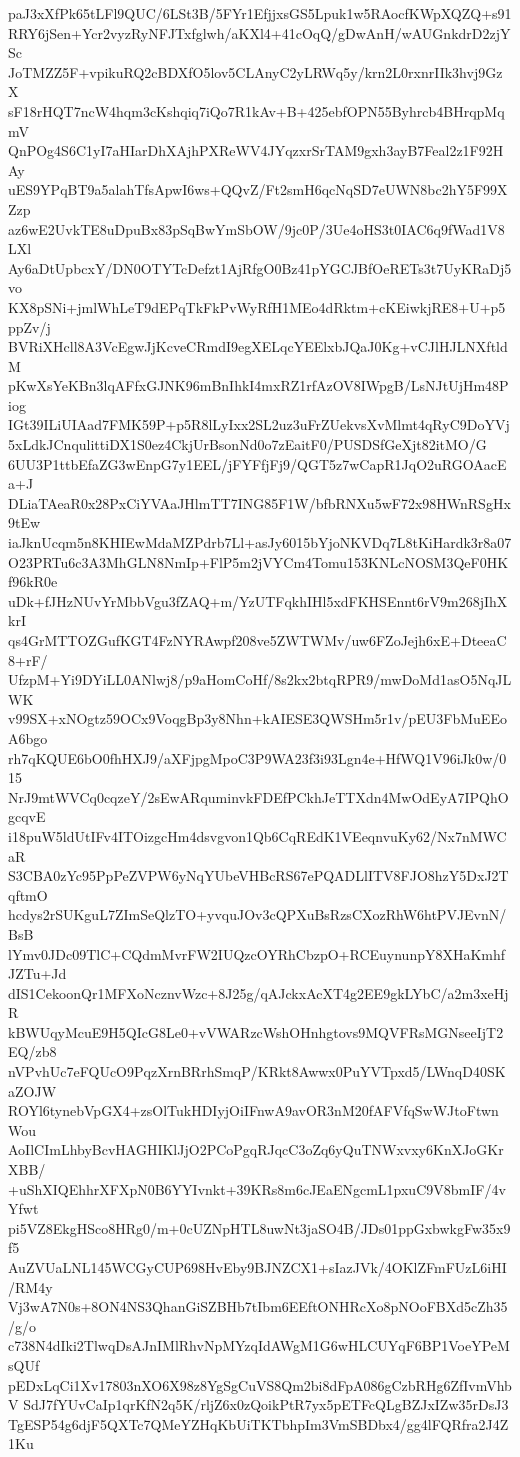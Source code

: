 paJ3xXfPk65tLFl9QUC/6LSt3B/5FYr1EfjjxsGS5Lpuk1w5RAocfKWpXQZQ+s91
RRY6jSen+Ycr2vyzRyNFJTxfglwh/aKXl4+41cOqQ/gDwAnH/wAUGnkdrD2zjYSc
JoTMZZ5F+vpikuRQ2cBDXfO5lov5CLAnyC2yLRWq5y/krn2L0rxnrIIk3hvj9GzX
sF18rHQT7ncW4hqm3cKshqiq7iQo7R1kAv+B+425ebfOPN55Byhrcb4BHrqpMqmV
QnPOg4S6C1yI7aHIarDhXAjhPXReWV4JYqzxrSrTAM9gxh3ayB7Feal2z1F92HAy
uES9YPqBT9a5alahTfsApwI6ws+QQvZ/Ft2smH6qcNqSD7eUWN8bc2hY5F99XZzp
az6wE2UvkTE8uDpuBx83pSqBwYmSbOW/9jc0P/3Ue4oHS3t0IAC6q9fWad1V8LXl
Ay6aDtUpbcxY/DN0OTYTcDefzt1AjRfgO0Bz41pYGCJBfOeRETs3t7UyKRaDj5vo
KX8pSNi+jmlWhLeT9dEPqTkFkPvWyRfH1MEo4dRktm+cKEiwkjRE8+U+p5ppZv/j
BVRiXHcll8A3VcEgwJjKcveCRmdI9egXELqcYEElxbJQaJ0Kg+vCJlHJLNXftldM
pKwXsYeKBn3lqAFfxGJNK96mBnIhkI4mxRZ1rfAzOV8IWpgB/LsNJtUjHm48Piog
IGt39ILiUIAad7FMK59P+p5R8lLyIxx2SL2uz3uFrZUekvsXvMlmt4qRyC9DoYVj
5xLdkJCnqulittiDX1S0ez4CkjUrBsonNd0o7zEaitF0/PUSDSfGeXjt82itMO/G
6UU3P1ttbEfaZG3wEnpG7y1EEL/jFYFfjFj9/QGT5z7wCapR1JqO2uRGOAacEa+J
DLiaTAeaR0x28PxCiYVAaJHlmTT7ING85F1W/bfbRNXu5wF72x98HWnRSgHx9tEw
iaJknUcqm5n8KHIEwMdaMZPdrb7Ll+asJy6015bYjoNKVDq7L8tKiHardk3r8a07
O23PRTu6c3A3MhGLN8NmIp+FlP5m2jVYCm4Tomu153KNLcNOSM3QeF0HKf96kR0e
uDk+fJHzNUvYrMbbVgu3fZAQ+m/YzUTFqkhIHl5xdFKHSEnnt6rV9m268jIhXkrI
qs4GrMTTOZGufKGT4FzNYRAwpf208ve5ZWTWMv/uw6FZoJejh6xE+DteeaC8+rF/
UfzpM+Yi9DYiLL0ANlwj8/p9aHomCoHf/8s2kx2btqRPR9/mwDoMd1asO5NqJLWK
v99SX+xNOgtz59OCx9VoqgBp3y8Nhn+kAIESE3QWSHm5r1v/pEU3FbMuEEoA6bgo
rh7qKQUE6bO0fhHXJ9/aXFjpgMpoC3P9WA23f3i93Lgn4e+HfWQ1V96iJk0w/015
NrJ9mtWVCq0cqzeY/2sEwARquminvkFDEfPCkhJeTTXdn4MwOdEyA7IPQhOgcqvE
i18puW5ldUtIFv4ITOizgcHm4dsvgvon1Qb6CqREdK1VEeqnvuKy62/Nx7nMWCaR
S3CBA0zYc95PpPeZVPW6yNqYUbeVHBcRS67ePQADLlITV8FJO8hzY5DxJ2TqftmO
hcdys2rSUKguL7ZImSeQlzTO+yvquJOv3cQPXuBsRzsCXozRhW6htPVJEvnN/BsB
lYmv0JDc09TlC+CQdmMvrFW2IUQzcOYRhCbzpO+RCEuynunpY8XHaKmhfJZTu+Jd
dIS1CekoonQr1MFXoNcznvWzc+8J25g/qAJckxAcXT4g2EE9gkLYbC/a2m3xeHjR
kBWUqyMcuE9H5QIcG8Le0+vVWARzcWshOHnhgtovs9MQVFRsMGNseeIjT2EQ/zb8
nVPvhUc7eFQUcO9PqzXrnBRrhSmqP/KRkt8Awwx0PuYVTpxd5/LWnqD40SKaZOJW
ROYl6tynebVpGX4+zsOlTukHDIyjOiIFnwA9avOR3nM20fAFVfqSwWJtoFtwnWou
AoIlCImLhbyBcvHAGHIKlJjO2PCoPgqRJqcC3oZq6yQuTNWxvxy6KnXJoGKrXBB/
+uShXIQEhhrXFXpN0B6YYIvnkt+39KRs8m6cJEaENgcmL1pxuC9V8bmIF/4vYfwt
pi5VZ8EkgHSco8HRg0/m+0cUZNpHTL8uwNt3jaSO4B/JDs01ppGxbwkgFw35x9f5
AuZVUaLNL145WCGyCUP698HvEby9BJNZCX1+sIazJVk/4OKlZFmFUzL6iHI/RM4y
Vj3wA7N0s+8ON4NS3QhanGiSZBHb7tIbm6EEftONHRcXo8pNOoFBXd5cZh35/g/o
c738N4dIki2TlwqDsAJnIMlRhvNpMYzqIdAWgM1G6wHLCUYqF6BP1VoeYPeMsQUf
pEDxLqCi1Xv17803nXO6X98z8YgSgCuVS8Qm2bi8dFpA086gCzbRHg6ZfIvmVhbV
SdJ7fYUvCaIp1qrKfN2q5K/rljZ6x0zQoikPtR7yx5pETFcQLgBZJxIZw35rDsJ3
TgESP54g6djF5QXTc7QMeYZHqKbUiTKTbhpIm3VmSBDbx4/gg4lFQRfra2J4Z1Ku
